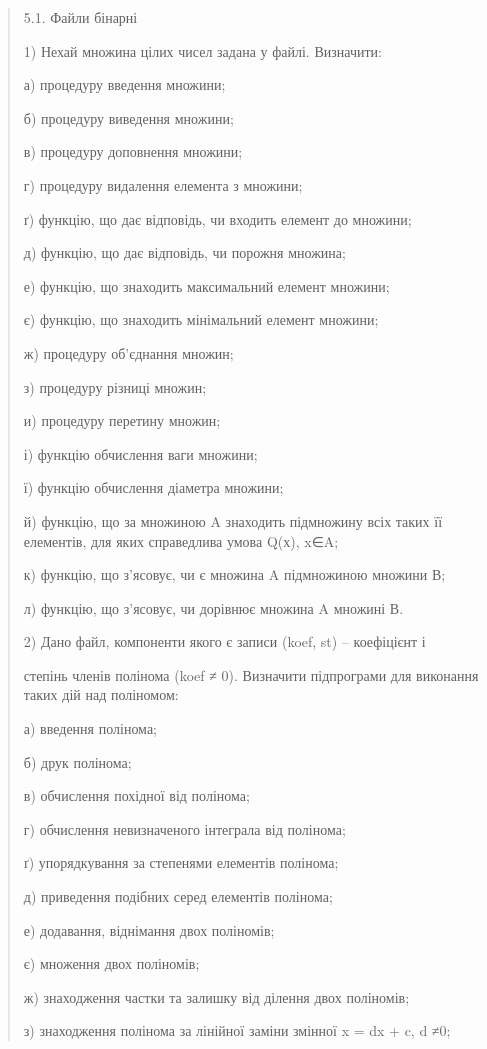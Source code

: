\documentclass[]{article}
\begin{document}
\begin{quote}
5.1. Файли бінарні

1) Нехай множина цілих чисел задана у файлі. Визначити:

а) процедуру введення множини;

б) процедуру виведення множини;

в) процедуру доповнення множини;

г) процедуру видалення елемента з множини;

ґ) функцію, що дає відповідь, чи входить елемент до множини;

д) функцію, що дає відповідь, чи порожня множина;

е) функцію, що знаходить максимальний елемент множини;

є) функцію, що знаходить мінімальний елемент множини;

ж) процедуру об'єднання множин;

з) процедуру різниці множин;

и) процедуру перетину множин;

і) функцію обчислення ваги множини;

ї) функцію обчислення діаметра множини;

й) функцію, що за множиною A знаходить підмножину всіх таких її
елементів, для яких справедлива умова Q(х), x∈A;

к) функцію, що з'ясовує, чи є множина A підмножиною множини В;

л) функцію, що з'ясовує, чи дорівнює множина A множині В.

2) Дано файл, компоненти якого є записи (koef, st) -- коефіцієнт і

степінь членів полінома (koef ≠ 0). Визначити підпрограми для виконання
таких дій над поліномом:

а) введення полінома;

б) друк полінома;

в) обчислення похідної від полінома;

г) обчислення невизначеного інтеграла від полінома;

ґ) упорядкування за степенями елементів полінома;

д) приведення подібних серед елементів полінома;

е) додавання, віднімання двох поліномів;

є) множення двох поліномів;

ж) знаходження частки та залишку від ділення двох поліномів;

з) знаходження полінома за лінійної заміни змінної x = dx + c, d ≠0;


\end{quote}
\end{document}
